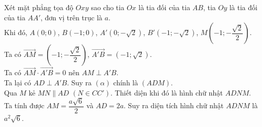 \begin{ex}
{		Xét  mặt phẳng tọa độ $Oxy$ sao cho tia $Ox$ là tia đối của tia $AB$, tia $Oy$ là tia đối của tia $AA'$, đơn vị trên trục là $a$.\\
		Khi  đó, $A(0;0)$, $B(-1;0)$, $A'\left(0;-\sqrt{2}\right)$, $B'\left(-1;-\sqrt{2}\right)$, $M\left(-1;-\dfrac{\sqrt{2}}{2}\right)$.\\
		Ta  có $\overrightarrow{AM}=\left(-1;-\dfrac{\sqrt{2}}{2}\right)$, $\overrightarrow{A'B}=\left(-1;\sqrt{2}\right)$.\\
		Ta có $\overrightarrow{AM}\cdot\overrightarrow{A'B}=0$ nên $AM\perp  A'B$.\\
		Ta lại có $AD\perp A'B$.  Suy ra $(\alpha)$ chính là $(ADM)$.\\
		Qua $M$ kẻ $MN\parallel AD$ $(N\in CC')$. Thiết  diện khi đó là hình chữ nhật $ADNM$.\\
		Ta  tính được $AM=\dfrac{a\sqrt{6}}{2}$ và $AD=2a$. Suy ra diện tích hình chữ nhật $ADNM$ là $a^2\sqrt{6}$.
	} 
\end{ex}


